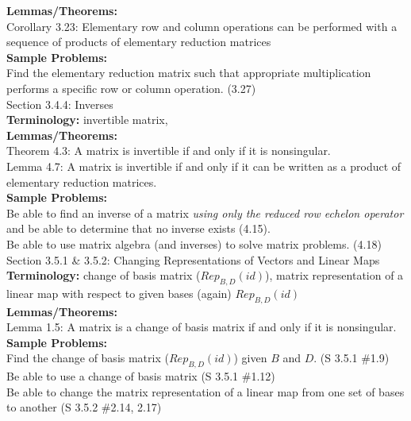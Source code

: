\documentclass[11pt,fleqn]{article}
\begin{document}
\textbf{Lemmas/Theorems:} \\
Corollary 3.23: Elementary row and column operations can be performed with a sequence of products of elementary reduction matrices\\

\textbf{Sample Problems:} \\
Find the elementary reduction matrix such that appropriate multiplication performs a specific row or column operation. (3.27)\\


\noindent Section 3.4.4: Inverses \\

\textbf{Terminology:} invertible matrix, \\

\textbf{Lemmas/Theorems:} \\
Theorem 4.3: A matrix is invertible if and only if it is nonsingular.\\
Lemma 4.7: A matrix is invertible if and only if it can be written as a product of elementary reduction matrices.\\

\textbf{Sample Problems:} \\
Be able to find an inverse of a matrix \emph{using only the reduced row echelon operator} and be able to determine that no inverse exists (4.15).\\
Be able to use matrix algebra (and inverses) to solve matrix problems. (4.18)\\

\noindent Section 3.5.1 \& 3.5.2: Changing Representations of Vectors and Linear Maps\\

\textbf{Terminology:} change of basis matrix ($Rep_{B,D}(id)$), matrix representation of a linear map with respect to given bases (again) $Rep_{B,D}(id)$\\

\textbf{Lemmas/Theorems:} \\
Lemma 1.5: A matrix is a change of basis matrix if and only if it is nonsingular.\\

\textbf{Sample Problems:} \\
Find the change of basis matrix ($Rep_{B,D}(id)$) given $B$ and $D$. (S 3.5.1 \#1.9)\\
Be able to use a change of basis matrix (S 3.5.1 \#1.12)\\
Be able to change the matrix representation of a linear map from one set of bases to another (S 3.5.2 \#2.14, 2.17)
\end{document}

